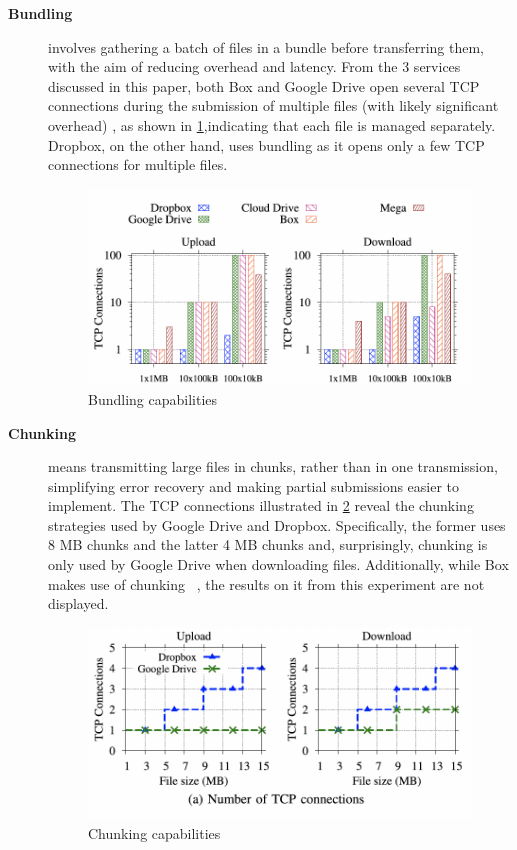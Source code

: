 \begin{description}
    \item[\textbf{Bundling}] involves gathering a batch of files in a bundle before transferring them, with the aim of reducing overhead and latency. From the 3 services discussed in this paper, both Box and Google Drive open several TCP connections during the submission of multiple files (with likely significant overhead) , as shown in  \ref{fig:bundling},indicating that each file is managed separately. Dropbox, on the other hand, uses bundling as it opens only a few TCP connections for multiple files.

    \begin{figure} [h]
        \centering
        \includegraphics[scale=0.7]{images/bundling}
        \caption{\label{fig:bundling}Bundling capabilities}
    \end{figure}

    \item[\textbf{Chunking}] means transmitting large files in chunks, rather than in one transmission, simplifying error recovery and making partial submissions easier to implement. The TCP connections illustrated in \ref{fig:chunking} reveal the chunking strategies used by Google Drive and Dropbox. Specifically, the former uses 8 MB chunks and the latter 4 MB chunks and, surprisingly, chunking is only used by Google Drive when downloading files. Additionally, while Box makes use of chunking ~\cite{box_chunked}, the results on it from this experiment are not displayed.

    \begin{figure} [h]
        \centering
        \includegraphics[scale=0.7]{images/chunking}
        \caption{\label{fig:chunking}Chunking capabilities}
    \end{figure}


\end{description}
